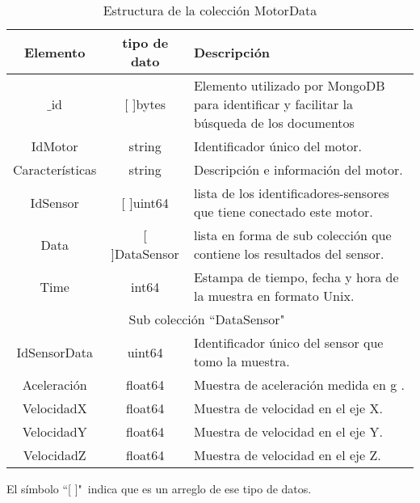     \begin{table}[ht]
        \begin{center}
        \caption[Estructura de MotorData]{Estructura de la colección MotorData}
        \label{tab:MotorDatabson}

            \vspace{0.3cm}
            \begin{tabular}{|c|c|p{9cm}|}
                \hline
                Elemento        & tipo de dato & Descripción \\\hline\hline
                $\_$id      & [ ]bytes  & Elemento utilizado por MongoDB para
                identificar y facilitar la búsqueda de los documentos\\\hline
                IdMotor         & string   & Identificador único del motor.\\\hline
                Características & string   & Descripción e información del motor.\\\hline
                IdSensor        & [ ]uint64 & lista de los identificadores-sensores
                que tiene conectado este motor.\\\hline
                Data            & [ ]DataSensor & lista en forma de sub colección
                que contiene los resultados del sensor.\\\hline
                Time            & int64  & Estampa de tiempo, fecha y hora de la muestra en formato Unix.\\\hline
                \hline
                \multicolumn{3}{|c|}{Sub colección  ``DataSensor"\ }\\\hline\hline
                IdSensorData & uint64 & Identificador único del sensor que tomo la muestra.\\\hline
                Aceleración  & float64 & Muestra de aceleración medida en g .\\\hline
                VelocidadX & float64 & Muestra de velocidad en el eje X.\\\hline
                VelocidadY & float64 & Muestra de velocidad en el eje Y.\\\hline
                VelocidadZ & float64 & Muestra de velocidad en el eje Z.\\
                \hline
            \end{tabular}

            \vspace{0.5cm}
            El símbolo ``[  ]"\  indica que es un arreglo de ese tipo de datos.
        \end{center}
    \end{table}

